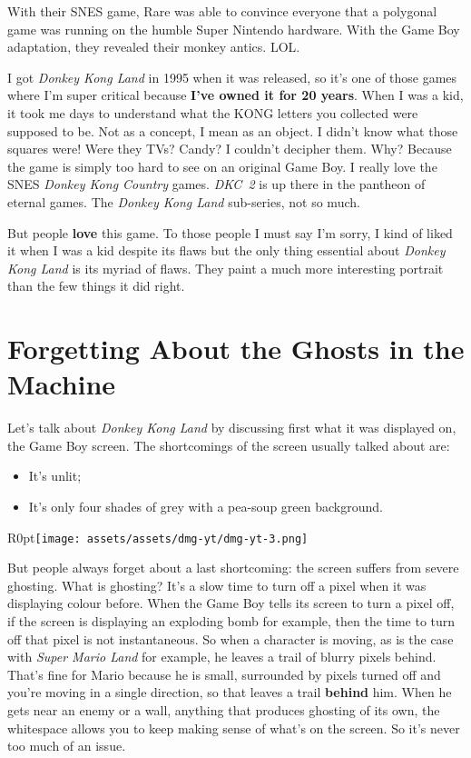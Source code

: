 \documentclass{book}
\begin{document}
With their SNES game, Rare was able to convince everyone that a polygonal game was running on the humble Super Nintendo hardware. With the Game Boy adaptation, they revealed their monkey antics. LOL.\par
I got \emph{Donkey Kong Land} in 1995 when it was released, so it’s one of those games where I’m super critical because \textbf{I’ve owned it for 20 years}. When I was a kid, it took me days to understand what the KONG letters you collected were supposed to be. Not as a concept, I mean as an object. I didn’t know what those squares were! Were they TVs? Candy? I couldn’t decipher them. Why? Because the game is simply too hard to see on an original Game Boy. I really love the SNES \emph{Donkey Kong Country} games. \emph{DKC~2} is up there in the pantheon of eternal games. The \emph{Donkey Kong Land} sub-series, not so much.\par
But people \textbf{love} this game. To those people I must say I’m sorry, I kind of liked it when I was a kid despite its flaws but the only thing essential about \emph{Donkey Kong Land} is its myriad of flaws. They paint a much more interesting portrait than the few things it did right.\par
\FloatBarrier\section*{Forgetting About the Ghosts in the Machine}
Let’s talk about \emph{Donkey Kong Land} by discussing first what it was displayed on, the Game Boy screen. The shortcomings of the screen usually talked about are:\par
\begin{itemize}

\item It’s unlit;
\item It’s only four shades of grey with a pea-soup green background.

\end{itemize}
\begin{wrapfigure}{R}{0pt}{\texttt{[image: assets/assets/dmg-yt/dmg-yt-3.png]}}\end{wrapfigure}
But people always forget about a last shortcoming: the screen suffers from severe ghosting. What is ghosting? It’s a slow time to turn off a pixel when it was displaying colour before. When the Game Boy tells its screen to turn a pixel off, if the screen is displaying an exploding bomb for example, then the time to turn off that pixel is not instantaneous. So when a character is moving, as is the case with \emph{Super Mario Land} for example, he leaves a trail of blurry pixels behind. That’s fine for Mario because he is small, surrounded by pixels turned off and you’re moving in a single direction, so that leaves a trail \textbf{behind} him. When he gets near an enemy or a wall, anything that produces ghosting of its own, the whitespace allows you to keep making sense of what’s on the screen. So it’s never too much of an issue.\par
\end{document}
